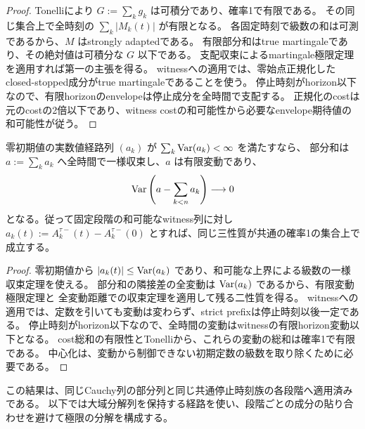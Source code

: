 \begin{proof}
Tonelliにより $G:=\sum_k g_k$ は可積分であり、確率1で有限である。
その同じ集合上で全時刻の $\sum_k |M_k(t)|$ が有限となる。
各固定時刻で級数の和は可測であるから、$M$ はstrongly adaptedである。
有限部分和はtrue martingaleであり、その絶対値は可積分な $G$ 以下である。
支配収束によるmartingale極限定理を適用すれば第一の主張を得る。
witnessへの適用では、零始点正規化したclosed-stopped成分がtrue martingaleであることを使う。
停止時刻がhorizon以下なので、有限horizonのenvelopeは停止成分を全時間で支配する。
正規化のcostは元のcostの2倍以下であり、witness costの和可能性から必要なenvelope期待値の
和可能性が従う。
\end{proof}
\begin{lemma}[中心化した有限変動成分の級数]
零初期値の実数値経路列 $(a_k)$ が $\sum_k\operatorname{Var}(a_k)<\infty$ を満たすなら、
部分和は $a:=\sum_k a_k$ へ全時間で一様収束し、$a$ は有限変動であり、
\[
 \operatorname{Var}\left(a-\sum_{k<n}a_k\right)\longrightarrow0
\]
となる。従って固定段階の和可能なwitness列に対し
$a_k(t):=A_k^{\tau-}(t)-A_k^{\tau-}(0)$ とすれば、同じ三性質が共通の確率1の集合上で成立する。
\end{lemma}
\begin{proof}
零初期値から $|a_k(t)|\le\operatorname{Var}(a_k)$ であり、和可能な上界による級数の一様収束定理を使える。
部分和の隣接差の全変動は $\operatorname{Var}(a_k)$ であるから、有限変動極限定理と
全変動距離での収束定理を適用して残る二性質を得る。
witnessへの適用では、定数を引いても変動は変わらず、strict prefixは停止時刻以後一定である。
停止時刻がhorizon以下なので、全時間の変動はwitnessの有限horizon変動以下となる。
cost総和の有限性とTonelliから、これらの変動の総和は確率1で有限である。
中心化は、変動から制御できない初期定数の級数を取り除くために必要である。
\end{proof}
この結果は、同じCauchy列の部分列と同じ共通停止時刻族の各段階へ適用済みである。
以下では大域分解列を保持する経路を使い、段階ごとの成分の貼り合わせを避けて極限の分解を構成する。

